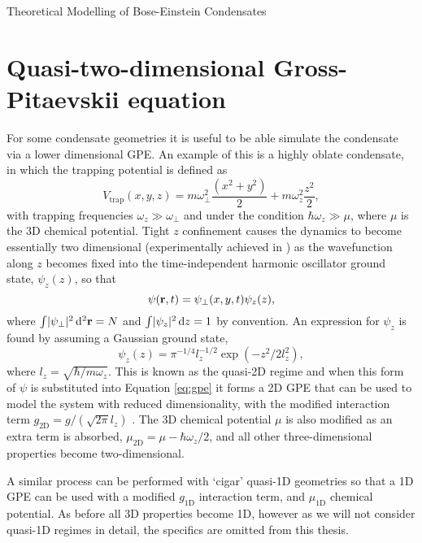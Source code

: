\begin{chapter}{\label{cha:theoretical_model}Theoretical Modelling of Bose-Einstein Condensates}
\section{\label{section:quasi2dgpe} Quasi-two-dimensional Gross-Pitaevskii equation}
	For some condensate geometries it is useful to be able simulate the condensate via a lower dimensional GPE. An example of this is a highly oblate condensate, in which the trapping potential is defined as
	\begin{equation}
		V_{\mathrm{trap}}(x,y,z)=m\omega_\perp^2\frac{\left ( x^2+y^2 \right )}{2} + m\omega_z^2\frac{z^2}{2},
	\end{equation}
	with trapping frequencies $\omega_z \gg \omega_\perp$ and under the condition $\hbar\omega_z \gg \mu$, where $\mu$ is the 3D chemical potential. Tight $z$ confinement causes the dynamics to become essentially two dimensional (experimentally achieved in \cite{Gorlitz}) as the wavefunction along $z$ becomes fixed into the time-independent harmonic oscillator ground state, $\psi_z(z)$, so that
	\begin{equation}
		\psi({\bf r},t) = \psi_\perp(x,y,t) \psi_z(z),
	\end{equation}
	where $\int\!|\psi_\perp|^2\,{\rm d}^2{\bf r} = N$ and $\int\!|\psi_z|^2\,{\rm d}z = 1$ by convention. An expression for $\psi_z$ is found by assuming a Gaussian ground state,
	\begin{equation}
		\psi_z(z) = \pi^{-1/4} l_z^{-1/2} \exp\left(-z^2/2l_z^2\right),
	\end{equation}
  where $l_z=\sqrt{\hbar/m \omega_z}$. This is known as the quasi-2D regime and when this form of $\psi$ is substituted into Equation \ref{eq:gpe} it forms a 2D GPE that can be used to model the system with reduced dimensionality, with the modified interaction term $g_{\mathrm{2D}} = g/( \sqrt{2\pi}l_z)$ \cite{parkerthesis}. The 3D chemical potential $\mu$ is also modified as an extra term is absorbed, $\mu_\mathrm{2D} = \mu - \hbar\omega_z/2$, and all other three-dimensional properties become two-dimensional.

	A similar process can be performed with `cigar' quasi-1D geometries so that a 1D GPE can be used with a modified $g_{\mathrm{1D}}$ interaction term, and $\mu_{\mathrm{1D}}$ chemical potential. As before all 3D properties become 1D, however as we will not consider quasi-1D regimes in detail, the specifics are omitted from this thesis.


\end{chapter}
